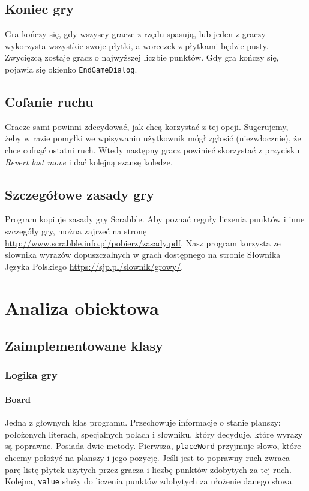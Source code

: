 \documentclass[a4paper]{article}
\begin{document}
\subsection{Koniec gry}
Gra kończy się, gdy wszyscy gracze z rzędu spasują, lub jeden z graczy wykorzysta wszystkie swoje płytki, a woreczek z płytkami będzie pusty.
Zwycięzcą zostaje gracz o najwyższej liczbie punktów.
Gdy gra kończy się, pojawia się okienko \texttt{EndGameDialog}.
\subsection{Cofanie ruchu}
Gracze sami powinni zdecydować, jak chcą korzystać z tej opcji.
Sugerujemy, żeby w razie pomyłki we wpisywaniu użytkownik mógł zgłosić (niezwłocznie), że chce cofnąć ostatni ruch.
Wtedy następny gracz powinieć skorzystać z przycisku \textit{Revert last move} i dać kolejną szansę koledze.
\subsection{Szczegółowe zasady gry}
Program kopiuje zasady gry Scrabble.
Aby poznać reguły liczenia punktów i inne szczegóły gry, można zajrzeć na stronę \url{http://www.scrabble.info.pl/pobierz/zasady.pdf}.
Nasz program korzysta ze słownika wyrazów dopuszczalnych w grach dostępnego na stronie Słownika Języka Polskiego \url{https://sjp.pl/slownik/growy/}.

\section{Analiza obiektowa}

\subsection{Zaimplementowane klasy}

\subsubsection{Logika gry}

\paragraph{Board} Jedna z głownych klas programu. Przechowuje informacje o stanie planszy: położonych literach, specjalnych polach i słowniku, który decyduje, które wyrazy są poprawne. Posiada dwie metody. Pierwsza, \texttt{placeWord} przyjmuje słowo, które chcemy położyć na planszy i jego pozycję. Jeśli jest to poprawny ruch zwraca parę listę płytek użytych przez gracza i liczbę punktów zdobytych za tej ruch. Kolejna, \texttt{value} służy do liczenia punktów zdobytych za ułożenie danego słowa.
\end{document}
